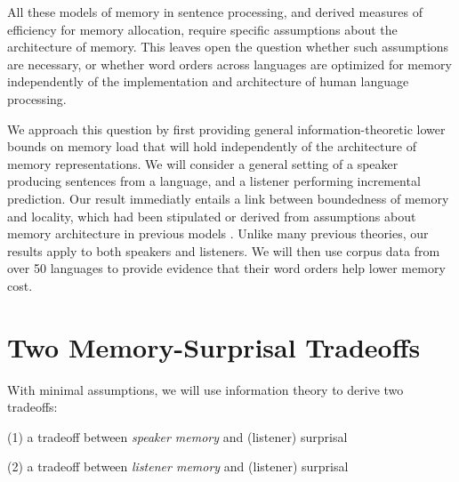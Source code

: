 \documentclass[11pt,letterpaper]{article}
\begin{document}
%
%
%
%
%





All these models of memory in sentence processing, and derived measures of efficiency for memory allocation, require specific assumptions about the architecture of memory.
This leaves open the question whether such assumptions are necessary, or whether word orders across languages are optimized for memory independently of the implementation and architecture of human language processing.


We approach this question by first providing general information-theoretic lower bounds on memory load that will hold independently of the architecture of memory representations.
We will consider a general setting of a speaker producing sentences from a language, and a listener performing incremental prediction.
Our result immediatly entails a link between boundedness of memory and locality, which had been stipulated or derived from assumptions about memory architecture in previous models \citep{gibson-linguistic-1998, lewis-activation-based-2005, futrell-noisy-context-2017}.
Unlike many previous theories, our results apply to both speakers and listeners.
We will then use corpus data from over 50 languages to provide evidence that their word orders help lower memory cost.


\section{Two Memory-Surprisal Tradeoffs}

With minimal assumptions, we will use information theory to derive two tradeoffs:

(1) a tradeoff between \emph{speaker memory} and (listener) surprisal

(2) a tradeoff between \emph{listener memory} and (listener) surprisal
\end{document}
